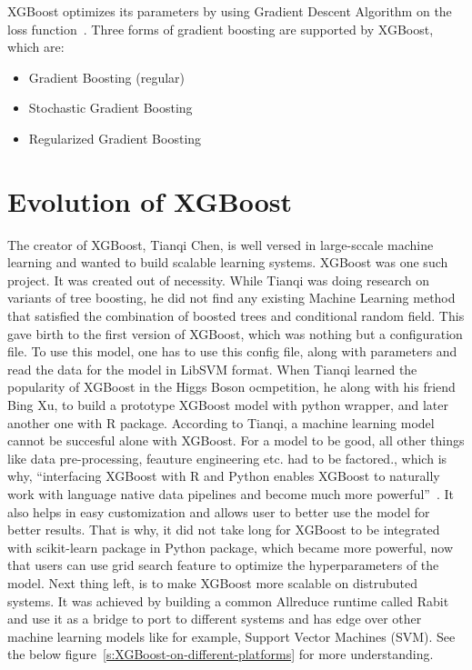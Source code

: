 XGBoost optimizes its parameters by using Gradient Descent Algorithm on the 
loss function~\cite{hid-sp18-401-XGBoost-MLmastery}. Three forms of gradient
boosting  are supported by XGBoost, which are:

\begin{itemize}
\item Gradient Boosting (regular)
\item Stochastic Gradient Boosting
\item Regularized Gradient Boosting 
\end{itemize}

\section{Evolution of XGBoost} 

The creator of XGBoost, Tianqi Chen, is well versed in large-sccale machine
learning and wanted to build scalable learning systems. XGBoost was one such
project. It was created out of necessity. While Tianqi was doing research on
variants of tree boosting, he did not find any existing Machine Learning
method that satisfied the  combination of boosted trees and conditional random
field. This gave birth to the first version of XGBoost, which was nothing but
a configuration file. To use this model,  one has to use this config file,
along with parameters and read the data for the model in LibSVM format. When
Tianqi learned the popularity of XGBoost in the Higgs Boson ocmpetition, he
along with his friend Bing Xu, to build a prototype XGBoost model with python
wrapper, and later another one with R package. According to Tianqi, a machine
learning model cannot be succesful alone with XGBoost. For a model to be good,
all other things like data pre-processing, feauture engineering etc. had to be
factored., which is why, ``interfacing XGBoost with R and Python enables
XGBoost to naturally work with language native data pipelines and become much
more powerful''~\cite{hid-sp18-401-XGBoost-evolution}. It also helps in easy
customization and allows user to better use the model for better results. That
is why, it did not take long for XGBoost to be integrated with scikit-learn
package in Python package, which became more powerful, now that users can use
grid search feature to optimize the hyperparameters of the model. Next thing
left, is to make XGBoost more scalable on distrubuted systems. It was achieved
by building a common Allreduce runtime called Rabit and use it as a bridge to
port to different systems and  has edge over other machine learning models
like for example, Support Vector Machines (SVM).
See the below figure~\ref{s:XGBoost-on-different-platforms} for more
understanding.



